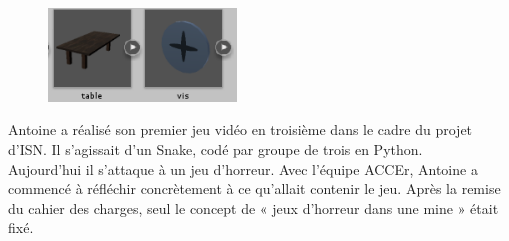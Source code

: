\documentclass[titlepage, 13px, a4paper]{article}
\begin{document}
\paragraph{} \hspace{0pt} \\
\begin{figure}
\includegraphics[width=5cm]{table-antoine.png}
\end{figure}
Antoine a réalisé son premier jeu vidéo en troisième dans le cadre du projet d'ISN. 
Il s'agissait d'un Snake, codé par groupe de trois en Python. 
\\
Aujourd'hui il s'attaque  à un jeu d'horreur. 
Avec l'équipe ACCEr, Antoine a commencé à réfléchir concrètement à ce qu'allait contenir le jeu. 
Après la remise du cahier des charges, seul le concept de « jeux d'horreur dans une mine » était fixé. 
\end{document}
